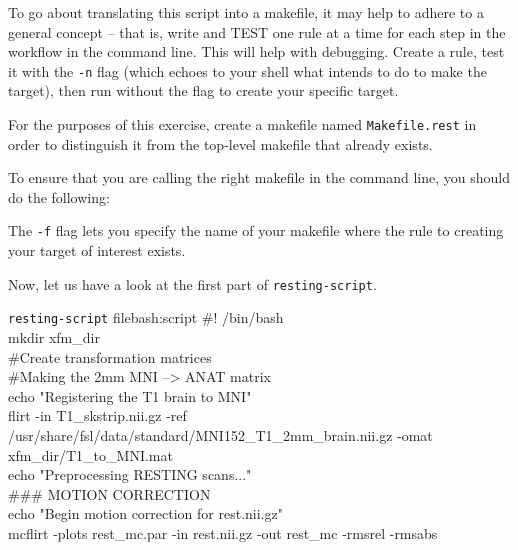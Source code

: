 To go about translating this script into a makefile, it may help to adhere to a general concept -- that is, write and TEST one rule at a time for each step in the workflow in the command line. This will help with debugging. Create a rule, test it with the \texttt{-n} flag (which echoes to your shell what \maken{} intends to do to make the target), then run \maken{} without the flag to create your specific target. 

For the purposes of this exercise, create a makefile named \texttt{Makefile.rest} in order to distinguish it from the top-level makefile that already exists.

To ensure that you are calling the right makefile in the command line, you should do the following: 

The \texttt{-f} flag lets you specify the name of your makefile where the rule to creating your target of interest exists.
\clearpage

Now, let us have a look at the first part of \texttt{resting-script}.


\begin{bash}{\texttt{resting-script} file}{bash:script}
\#! /bin/bash \\

mkdir xfm_dir \\

\#Create transformation matrices \\

\#Making the 2mm MNI --> ANAT matrix \\
echo "Registering the T1 brain to MNI" \\
flirt -in T1_skstrip.nii.gz -ref /usr/share/fsl/data/standard/MNI152_T1_2mm_brain.nii.gz -omat xfm_dir/T1_to_MNI.mat \\
echo "Preprocessing RESTING scans..." \\

\#\#\# MOTION CORRECTION \\
echo "Begin motion correction for rest.nii.gz" \\
mcflirt -plots rest_mc.par -in rest.nii.gz -out rest_mc -rmsrel -rmsabs 
\end{bash}

